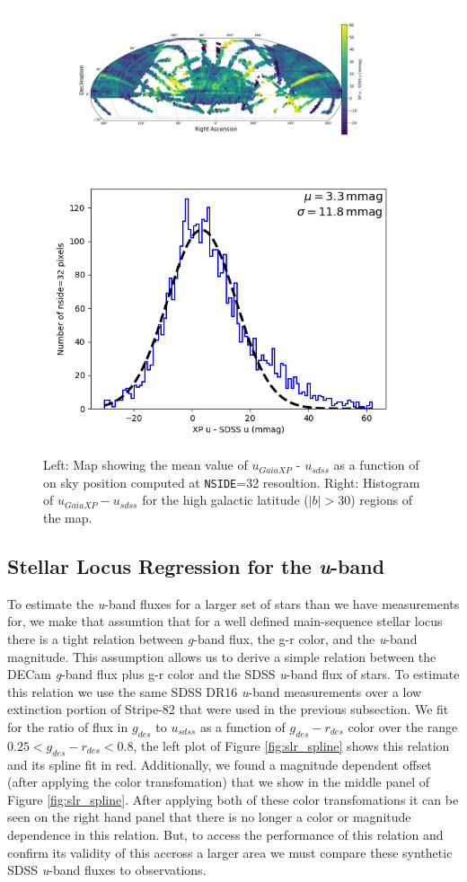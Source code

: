 \begin{figure}
    \includegraphics[width=0.64\linewidth]{./figures/u-band/uxp-usdss_full_map.png}
    \includegraphics[width=0.32\linewidth]{./figures/u-band/uxp-usdss_highglat_hist.png}
    \caption{Left: Map showing the mean value of $u_{GaiaXP}$ - $u_{sdss}$ as a function of on sky position computed at \texttt{NSIDE}=32 resoultion.  
    Right: Histogram of $u_{GaiaXP} - u_{sdss}$ for the high galactic latitude ($|b| > 30$) regions of the map.}
    \label{fig:sdss-gaiaxp-u}
\end{figure}



\subsection{Stellar Locus Regression for the \textit{u}-band}
\label{sec:slr}
To estimate the \textit{u}-band fluxes for a larger set of stars than we have measurements for, we make that assumtion that for a well defined main-sequence stellar locus there is a tight relation between \textit{g}-band flux, the g-r color, and the \textit{u}-band magnitude.
This assumption allows us to derive a simple relation between the DECam \textit{g}-band flux plus g-r color and the SDSS \textit{u}-band flux of stars. 
To estimate this relation we use the same SDSS DR16 \textit{u}-band measurements over a low extinction portion of Stripe-82 that were used in the previous subsection. 
We fit for the ratio of flux in $g_{des}$ to $u_{sdss}$ as a function of $g_{des}-r_{des}$ color over the range $0.25 <  g_{des}-r_{des} < 0.8$, the left plot of Figure \ref{fig:slr_spline} shows this relation and its spline fit in red. 
Additionally, we found a magnitude dependent offset (after applying the color transfomation) that we show in the middle panel of Figure \ref{fig:slr_spline}. 
After applying both of these color transfomations it can be seen on the right hand panel that there is no longer a color or magnitude dependence in this relation. 
But, to access the performance of this relation and confirm its validity of this accross a larger area we must compare these synthetic SDSS \textit{u}-band fluxes to observations.

